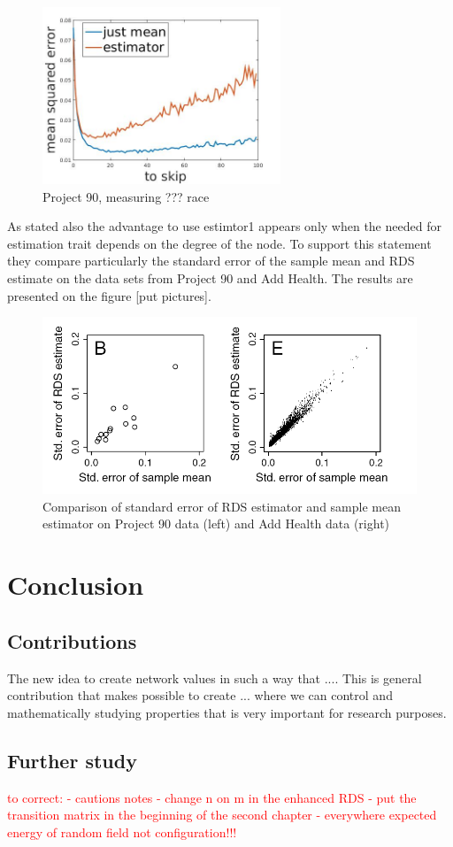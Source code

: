 \documentclass[12pt]{report}
\newcommand\myworries[1]{\textcolor{red}{#1}}
\begin{document}
\begin{figure}[h]
    \centering
    \includegraphics[height=200px]{Pr90field}
    \caption{ Project 90, measuring ??? race}
\end{figure}


As stated also \cite{goel2010assessing} the advantage to use estimtor1 appears only when the needed for estimation trait depends on the degree of the node. To support this statement they compare particularly the standard error of the sample mean and RDS estimate on the data sets from Project 90 and Add Health. The results are presented on the figure [put pictures]. 



\begin{figure}[h]
    \centering
    \includegraphics[height=200px]{rdsVSmean}
    \caption{ Comparison of standard error of RDS estimator and sample mean estimator on Project 90 data (left) and Add Health data (right)  \cite{goel2010assessing}}
\end{figure}

\chapter{Conclusion}

\section{Contributions}


The new idea to create network values in such a way that ....
This is general contribution that makes possible to create ... where we can control and mathematically studying properties that is very important for research purposes.

\section{Further study}

\myworries{
to correct:
- cautions notes 
- change n on m in the enhanced RDS
- put the transition matrix in the beginning of the second chapter
- everywhere expected energy of random field not configuration!!!
}



\end{document}
